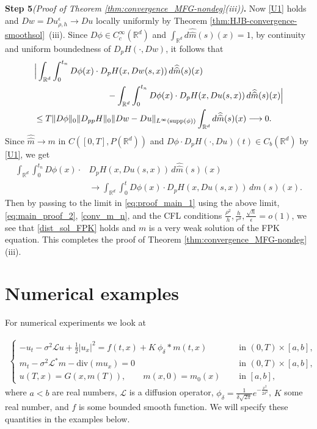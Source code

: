 \documentclass[a4paper,  twoside, 10pt, leqno]{amsart}
\newcommand{\rd}{\mathbb{R}^d}
\theoremstyle{remark}
\theoremstyle{definition}
\begin{document}
\noindent \textbf{Step 5}\textit{(Proof of Theorem \ref{thm:convergence_MFG-nondeg}(iii))}\textbf{.} \quad Now \ref{U1} holds and  $Dw=Du_{\rho,h}^{\epsilon}\rightarrow Du$ locally uniformly by Theorem \ref{thm:HJB-convergence-smoothsol}~(iii).  
Since $D \phi \in C^{\infty}_c(\rd)$ and $\int_{\rd} d\widehat{\widehat{m}}(s)(x) =1$, by continuity and uniform boundedness of $D_p H(\cdot, Dw)$, it follows that 
\begin{align} \label{eq:main_proof_2}
\begin{split}
 & \Big|\int_{\rd} \int_{0}^{t_n}  D\phi(x)\cdot D_p H(x,Dw(s,x)) \, d\widehat{\widehat{m}}(s)(x) \\
 & \hspace*{3cm} - \int_{\rd} \int_0^{t_n} D\phi(x)\cdot D_p H(x,Du(s,x)) \, d{\widehat{\widehat{m}}}(s)(x)\Big|  \\
& \leq T \|D\phi\|_0 \|D_{pp} H\|_0 \|Dw - Du \|_{L^{\infty}(\textup{supp}(\phi))}  \int_{\rd} d\widehat{\widehat{m}}(s)(x)  \longrightarrow 0.
\end{split}
\end{align} 
Since $\widehat{\widehat{m}} \rightarrow m$ in $C([0,T], P(\rd))$ and $D\phi\cdot D_p H(\cdot,Du)(t) \in C_b(\rd)$ by \ref{U1}, we get
\begin{align*}%
 \int_{\rd} \int_{0}^{t_n}  D\phi(x)\cdot & D_p H(x,Du(s,x)) \, d\widehat{\widehat{m}}(s)(x) \\ 
 & \longrightarrow \int_{\rd} \int_0^t D\phi(x)\cdot D_p H(x,Du(s,x)) \, d{m}(s)(x).
\end{align*}
Then by passing to the limit in \eqref{eq:proof_main_1} using the above limit,  \eqref{eq:main_proof_2}, \eqref{conv_m_n}, and the CFL conditions $\frac{\rho^2}{h},\frac{h}{r^{\sigma}},\frac{\sqrt{h}}{\epsilon}=\mathit{o}(1)$,  we see that \eqref{dist_sol_FPK} holds and ${m}$ is a  very weak solution of the FPK equation. This completes the proof of Theorem \ref{thm:convergence_MFG-nondeg}(iii).   

\section{Numerical examples} \label{sec:numerics}

For numerical experiments we look at

\begin{align}
 \begin{cases}
     -u_t - \sigma^2 \mathcal{L} u + \frac{1}{2} |u_x|^{2} = f ( t,x ) + K \ \phi_{ \delta } \ast m ( t,x ) \quad &\text{ in } (0,T)\times [ a,b ], \\
        m_t - \sigma^2 \mathcal{L}^{*} m - \text{div} (m u_x ) = 0 \quad &\text{ in } (0,T)\times [ a,b ], \\
        u (T,x) = G(x,m(T)), \qquad m(x,0) = m_0 (x) \quad &\text{ in } [ a,b ],
    \end{cases}
    \label{eqn:MFG_numerical}
\end{align}
where $a<b$ are real numbers, $\mathcal{L}$ is a diffusion operator, $\phi_{\delta} = \frac{1}{\delta \sqrt{2 \pi}} e^{-\frac{x^2}{2 \delta^2}} $, $K$ some real number, and $f$ is some bounded smooth function. We will specify these quantities in the examples below. 
\end{document}
